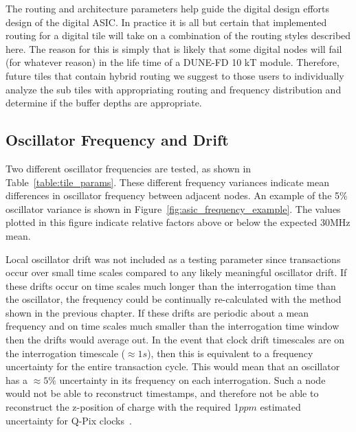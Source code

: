 The routing and architecture parameters help guide the digital design efforts design of the digital ASIC.
In practice it is all but certain that implemented routing for a digital tile will take on a combination of the routing styles described here.
The reason for this is simply that is likely that some digital nodes will fail (for whatever reason) in the life time of a DUNE-FD 10 kT module.
Therefore, future tiles that contain hybrid routing we suggest to those users to individually analyze the sub tiles with appropriating routing and frequency distribution and determine if the buffer depths are appropriate.

\subsection{Oscillator Frequency and Drift}

Two different oscillator frequencies are tested, as shown in Table~\ref{table:tile_params}.
These different frequency variances indicate mean differences in oscillator frequency between adjacent nodes.
An example of the 5\% oscillator variance is shown in Figure~\ref{fig:asic_frequency_example}.
The values plotted in this figure indicate relative factors above or below the expected 30\unit{MHz} mean.

Local oscillator drift was not included as a testing parameter since transactions occur over small time scales compared to any likely meaningful oscillator drift.
If these drifts occur on time scales much longer than the interrogation time than the oscillator, the frequency could be continually re-calculated with the method shown in the previous chapter.
If these drifts are periodic about a mean frequency and on time scales much smaller than the interrogation time window then the drifts would average out.
In the event that clock drift timescales are on the interrogation timescale ($\approx 1\unit{s}$), then this is equivalent to a frequency uncertainty for the entire transaction cycle.
This would mean that an oscillator has a $\approx 5\%$ uncertainty in its frequency on each interrogation.
Such a node would not be able to reconstruct timestamps, and therefore not be able to reconstruct the z-position of charge with the required 1$\unit{ppm}$ estimated uncertainty for Q-Pix clocks~\citep{qpix:nygren:mei}.


